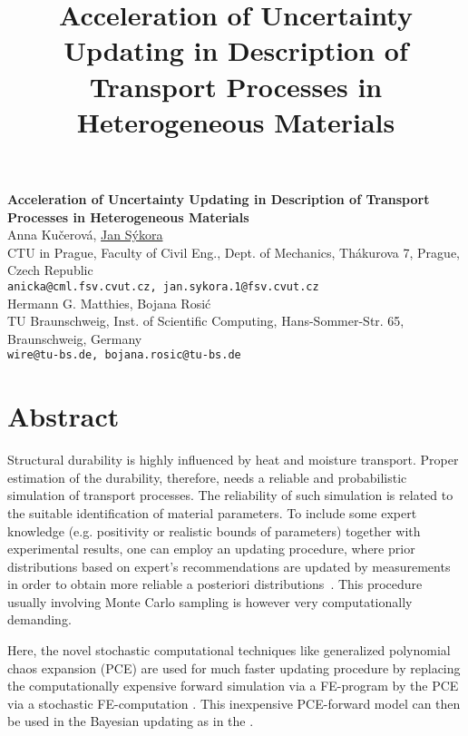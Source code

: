 \title{Acceleration of Uncertainty Updating in Description of Transport Processes in Heterogeneous Materials}
\author{} \institute{}

\begin{center}

\textbf{\Large Acceleration of Uncertainty Updating in Description of Transport Processes in Heterogeneous Materials}\\
\vspace{10mm}
{\large Anna Ku\v{c}erov\'a, \underline{Jan S\'ykora}}\\
CTU in Prague, Faculty of Civil Eng., Dept. of Mechanics, Th\'akurova 7, Prague, Czech Republic\\
{\tt anicka@cml.fsv.cvut.cz, jan.sykora.1@fsv.cvut.cz}\\
\vspace{4mm}
{\large Hermann G. Matthies, Bojana Rosi\'c}\\
TU Braunschweig, Inst. of Scientific Computing, Hans-Sommer-Str. 65, Braunschweig, Germany\\
{\tt wire@tu-bs.de, bojana.rosic@tu-bs.de}

\end{center}

\section*{Abstract}

Structural durability is highly influenced by heat and moisture transport. Proper estimation of the durability, therefore, needs a reliable and probabilistic simulation of transport processes.  The reliability of such simulation is related to the suitable identification of material parameters. To include some expert knowledge (e.g. positivity or realistic bounds of parameters) together with experimental results, one can employ an updating procedure, where prior distributions based on expert's recommendations are updated by measurements in order to obtain more reliable a posteriori distributions~\cite{Kucerova:2010:AMC}. This procedure usually involving Monte Carlo sampling is however very computationally demanding.

Here, the novel stochastic computational techniques like generalized polynomial chaos expansion (PCE) are used for much faster updating procedure by replacing the computationally expensive forward simulation via a FE-program by the PCE via a stochastic FE-computation \cite{Matthies:2007:IB}. This inexpensive PCE-forward model can then be used in the Bayesian updating as in the \cite{Kucerova:2010:AMC}.

